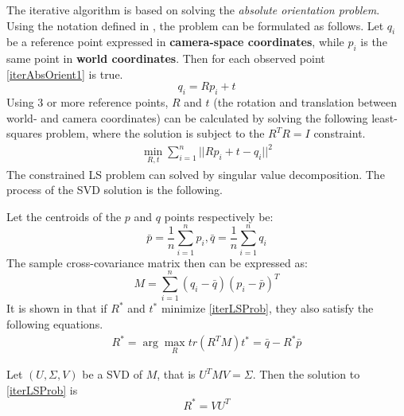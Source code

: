 The iterative algorithm is based on solving the \textit{absolute orientation problem}.
Using the notation defined in \cite{iterative}, the problem can be formulated as follows.
Let $q_i$ be a reference point expressed in \textbf{camera-space coordinates}, while $p_i$ is the same point in \textbf{world coordinates}.
Then for each observed point \eqref{iterAbsOrient1} is true.
\begin{equation}
	q_i = R p_i + t
	\label{eq:iterAbsOrient1}
\end{equation}
Using 3 or more reference points, $R$ and $t$ (the rotation and translation between world- and camera coordinates) can be calculated by solving the following least-squares problem\cite{iterative}, where the solution is subject to the $R^TR = I$ constraint.
\begin{align}
	\min_{R,t} \sum_{i=1}^{n} ||R p_i + t - q_i ||^2
	\label{eq:iterLSProb}
\end{align}
The constrained LS problem can solved by singular value decomposition.
The process of the SVD solution is the following.

Let the centroids of the $p$ and $q$ points respectively be:
\begin{equation}
	\bar{p} = \frac{1}{n} \sum_{i=1}^{n} p_i,
	\bar{q} = \frac{1}{n} \sum_{i=1}^{n} q_i
\end{equation}
The sample cross-covariance matrix then can be expressed as:
\begin{equation}
	M = \sum_{i=1}^{n} (q_i - \bar{q})(p_i - \bar{p})^T
\end{equation}
It is shown in \cite{iterative} that if $R^*$ and $t^*$ minimize \eqref{iterLSProb}, they also satisfy the following equations.
\begin{align}
	R^* = \arg \max_R tr(R^TM)
	t^* = \bar{q} - R^*\bar{p}
\end{align}

Let $(U,\Sigma, V)$ be a SVD of $M$, that is $U^TMV=\Sigma$. Then the solution to \eqref{iterLSProb} is\cite{iterative}
\begin{equation}
	R^* = VU^T
	\label{eq:iterOrientSolution}
\end{equation}

